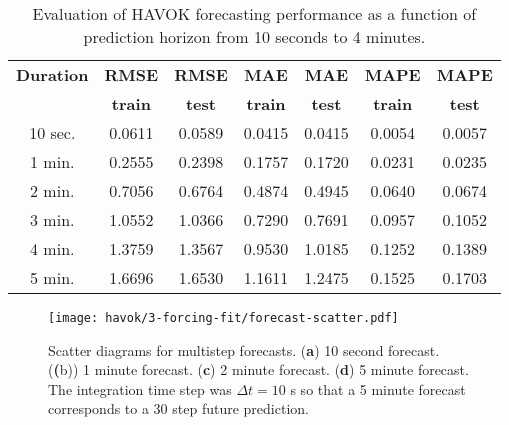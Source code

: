 \begin{table}[h]
  \caption{Evaluation of HAVOK forecasting performance as a function of
    prediction horizon from 10 seconds to 4 minutes.}
  \label{tab:havok-forecasting-results}
  \centering
  \begin{tabular}{ccccccc} \hline
    \textbf{Duration} & \textbf{RMSE}  & \textbf{RMSE} & \textbf{MAE}   & \textbf{MAE}  & \textbf{MAPE}  & \textbf{MAPE} \\
                      & \textbf{train} & \textbf{test} & \textbf{train} & \textbf{test} & \textbf{train} & \textbf{test} \\\hline
    10 sec.	  & 0.0611 & 0.0589 & 0.0415 & 0.0415 & 0.0054 & 0.0057 \\
    1 min.	  & 0.2555 & 0.2398 & 0.1757 & 0.1720 & 0.0231 & 0.0235 \\
    2 min.	  & 0.7056 & 0.6764 & 0.4874 & 0.4945 & 0.0640 & 0.0674 \\
    3 min.	  & 1.0552 & 1.0366 & 0.7290 & 0.7691 & 0.0957 & 0.1052 \\
    4 min.	  & 1.3759 & 1.3567 & 0.9530 & 1.0185 & 0.1252 & 0.1389 \\
    5 min. 	  & 1.6696 & 1.6530 & 1.1611 & 1.2475 & 0.1525 & 0.1703
  \end{tabular}
\end{table}






\begin{figure}[h]
  \centering
  \texttt{[image: havok/3-forcing-fit/forecast-scatter.pdf]}
  \caption{Scatter diagrams for multistep forecasts. (\textbf{a}) 10 second
    forecast. (\textbf(b)) 1 minute forecast. (\textbf{c}) 2 minute forecast.
    (\textbf{d}) 5 minute forecast. The integration time step was $\Delta t =
    10$ s so that a 5 minute forecast corresponds to a 30 step future prediction.}
  \label{fig:pm-time-series-w-forcing}
\end{figure}

